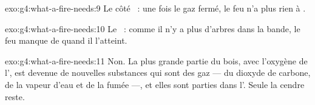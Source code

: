 \begin{solution}{exo:g4:what-a-fire-needs:9}
Le côté ~: une fois le gaz fermé, le feu n'a plus rien à
.
\end{solution}

\begin{solution}{exo:g4:what-a-fire-needs:10}
Le ~: comme il n'y a plus d'arbres dans la bande, le feu
manque de  quand il l'atteint.
\end{solution}

\begin{solution}{exo:g4:what-a-fire-needs:11}
Non. La plus grande partie du bois, avec l'oxygène de l', est
devenue de nouvelles substances qui sont des gaz --- du dioxyde de
carbone, de la vapeur d'eau et de la fumée ---, et elles sont parties
dans l'. Seule la cendre reste.
\end{solution}
